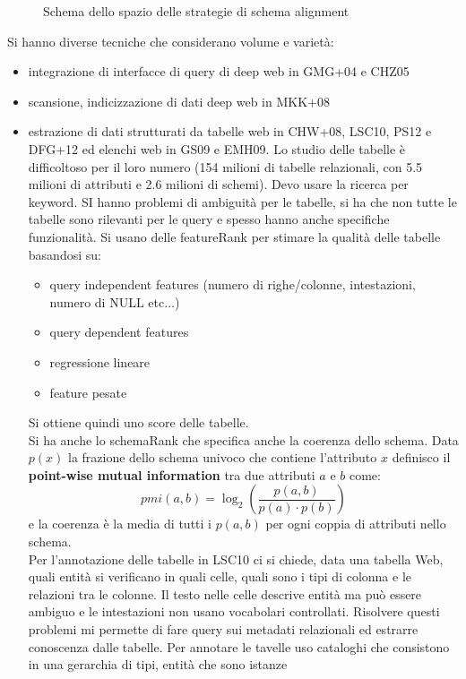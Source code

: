 \documentclass[a4paper,12pt, oneside]{book}
\begin{document}
\begin{itemize}
\begin{figure}
    \caption{Schema dello spazio delle strategie di schema alignment}
    \label{fig:bds}
  \end{figure}
\end{itemize}
Si hanno diverse tecniche che considerano volume e varietà:
\begin{itemize}
  \item integrazione di interfacce di query di deep web in GMG+04 e CHZ05 
  \item scansione, indicizzazione di dati deep web in MKK+08
  \item estrazione di dati strutturati da tabelle web in CHW+08, LSC10, PS12 e
  DFG+12 ed elenchi web in GS09 e EMH09. Lo studio delle tabelle è difficoltoso
  per il loro numero (154 milioni di tabelle relazionali, con 5.5 milioni di
  attributi e 2.6 milioni di schemi). Devo usare la ricerca per keyword. SI
  hanno problemi di ambiguità per le tabelle, si ha che non tutte le
  tabelle sono rilevanti per le query e spesso hanno anche specifiche
  funzionalità. Si usano delle featureRank per stimare la qualità delle tabelle
  basandosi su:
  \begin{itemize}
    \item query independent features (numero di righe/colonne, intestazioni,
    numero di NULL etc$\ldots$)
    \item query dependent features
    \item regressione lineare
    \item feature pesate
  \end{itemize}
  Si ottiene quindi uno score delle tabelle.\\
  Si ha anche lo schemaRank che specifica anche la coerenza dello schema. Data
  $p(x)$ la frazione dello schema univoco che contiene l'attributo $x$ definisco
  il \textbf{point-wise mutual information} tra due attributi $a$ e $b$ come:
  \[pmi(a,b)=\log_2\left(\frac{p(a,b)}{p(a)\cdot p(b)}\right)\]
  e la coerenza è la media di tutti i $p(a,b)$ per ogni coppia di attributi
  nello schema. \\
  Per l'annotazione delle tabelle in LSC10 ci si chiede, data una
  tabella Web, quali entità si verificano in quali celle, quali sono i tipi di
  colonna e le relazioni tra le colonne. Il testo nelle celle descrive entità ma
  può essere ambiguo e le intestazioni non usano vocabolari
  controllati. Risolvere questi problemi mi permette di fare query sui metadati
  relazionali ed estrarre conoscenza dalle tabelle. Per annotare le tavelle uso
  cataloghi che consistono in una gerarchia di tipi, entità che sono istanze

\end{itemize}
\end{document}

